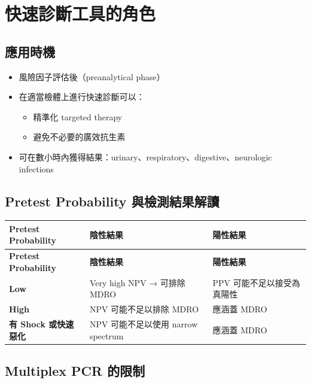 \documentclass[12pt,a4paper]{article}
\begin{document}
\section{快速診斷工具的角色}

\subsection{應用時機}

\begin{itemize}
    \item 風險因子評估後（preanalytical phase）
    \item 在適當檢體上進行快速診斷可以：
    \begin{itemize}
        \item 精準化 targeted therapy
        \item 避免不必要的廣效抗生素
    \end{itemize}
    \item 可在數小時內獲得結果：urinary、respiratory、digestive、neurologic infections
\end{itemize}

\subsection{Pretest Probability 與檢測結果解讀}

\begin{longtable}{p{4cm}p{5cm}p{5cm}}
\toprule
\textbf{Pretest Probability} & \textbf{陰性結果} & \textbf{陽性結果} \\
\midrule
\endfirsthead

\toprule
\textbf{Pretest Probability} & \textbf{陰性結果} & \textbf{陽性結果} \\
\midrule
\endhead

\bottomrule
\endfoot

\textbf{Low} & Very high NPV → 可排除 MDRO & PPV 可能不足以接受為真陽性 \\
\midrule
\textbf{High} & NPV 可能不足以排除 MDRO & 應涵蓋 MDRO \\
\midrule
\textbf{有 Shock 或快速惡化} & NPV 可能不足以使用 narrow spectrum & 應涵蓋 MDRO \\
\bottomrule
\end{longtable}

\subsection{Multiplex PCR 的限制}
\end{document}
